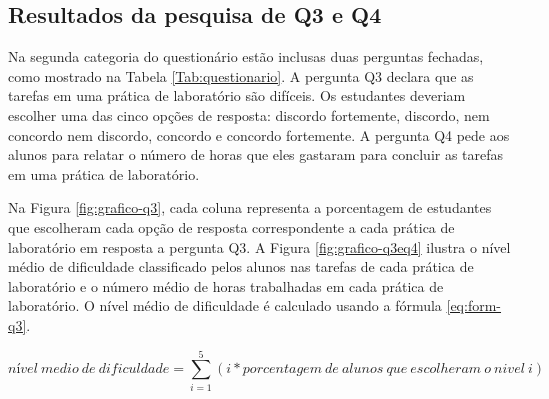 \subsection{Resultados da pesquisa de Q3 e Q4}

Na segunda categoria do questionário estão inclusas duas perguntas fechadas, como mostrado na Tabela \ref{Tab:questionario}. A pergunta Q3 declara que as tarefas em uma prática de laboratório são difíceis. Os estudantes deveriam escolher uma das cinco opções de resposta: discordo fortemente, discordo, nem concordo nem discordo, concordo e concordo fortemente. A pergunta Q4 pede aos alunos para relatar o número de horas que eles gastaram para concluir as tarefas em uma prática de laboratório.

Na Figura \ref{fig:grafico-q3}, cada coluna representa a porcentagem de estudantes que escolheram cada opção de resposta correspondente a cada prática de laboratório em resposta a pergunta Q3. A Figura \ref{fig:grafico-q3eq4} ilustra o nível médio de dificuldade classificado pelos alunos nas tarefas de cada prática de laboratório e o número médio de horas trabalhadas em cada prática de laboratório. O nível médio de dificuldade é calculado usando a fórmula \ref{eq:form-q3}.


\begin{equation}\label{eq:form-q3}
nível \ medio \ de \ dificuldade = \sum_{i=1}^{5} (i*porcentagem \ de \ alunos \ que \ escolheram \ o \ nivel \ i)
\end{equation}



\begin{figure}[htb!] 
   	    \captionsetup{width=15cm}%
\end{figure}

